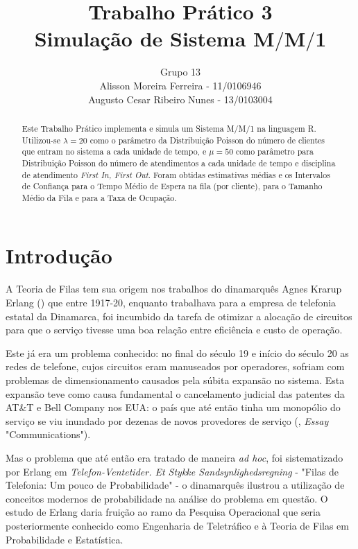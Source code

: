 \documentclass[a4paper,12pt,english,brazil]{article}
\begin{document}



\title{Trabalho Prático 3 \\ Simulação de Sistema M$/$M$/$1}
\author{Grupo 13 \\ Alisson Moreira Ferreira - 11/0106946 \\ Augusto Cesar Ribeiro Nunes - 13/0103004}
\maketitle
\begin{abstract}
Este Trabalho Prático implementa e simula um Sistema M$/$M$/$1 na linguagem R. Utilizou-se $\lambda = 20$ como o parâmetro da Distribuição Poisson do número de clientes que entram no sistema a cada unidade de tempo, e $\mu = 50$ como parâmetro para Distribuição Poisson do número de atendimentos a cada unidade de tempo e disciplina de atendimento \textit{First In, First Out}. Foram obtidas estimativas médias e os Intervalos de Confiança para o Tempo Médio de Espera na fila (por cliente), para o Tamanho Médio da Fila e para a Taxa de Ocupação.
\end{abstract}

\section{Introdução}
A Teoria de Filas tem sua origem nos trabalhos do dinamarquês Agnes Krarup Erlang (\cite{wiki:001}) que entre 1917-20, enquanto trabalhava para a empresa de telefonia estatal da Dinamarca, foi incumbido da tarefa de otimizar a alocação de circuitos para que o serviço tivesse uma boa relação entre eficiência e custo de operação.

Este já era um problema conhecido: no final do século 19 e início do século 20 as redes de telefone, cujos circuitos eram manuseados por operadores, sofriam com problemas de dimensionamento causados pela súbita expansão no sistema. Esta expansão teve como causa fundamental o cancelamento judicial das patentes da AT\&T e Bell Company nos EUA: o país que até então tinha um monopólio do serviço se viu inundado por dezenas de novos provedores de serviço (\cite{northrup2011american}, \textit{Essay} "Communications"). 

Mas o problema que até então era tratado de maneira \textit{ad hoc}, foi sistematizado por Erlang em \textit{Telefon-Ventetider. Et Stykke Sandsynlighedsregning} - "Filas de Telefonia: Um pouco de Probabilidade" - o dinamarquês ilustrou a utilização de conceitos modernos de probabilidade na análise do problema em questão. O estudo de Erlang daria fruição ao ramo da Pesquisa Operacional que seria posteriormente conhecido como Engenharia de Teletráfico e à Teoria de Filas em Probabilidade e Estatística. 
\end{document}
